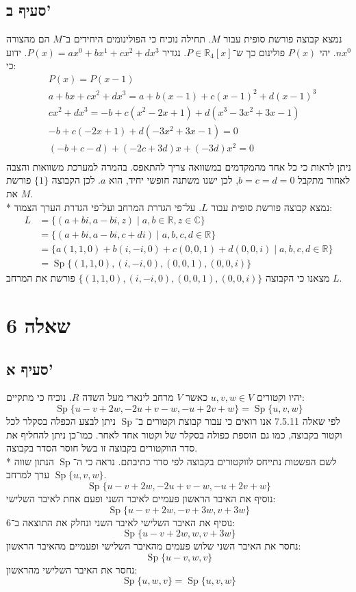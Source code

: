 \documentclass[a4paper,10pt]{article}
\DeclareMathOperator\Sp{Sp}
\def\RR{\mathbb{R}}
\def\CC{\mathbb{C}}
\begin{document}
	\subsection{סעיף ב'}
	נמצא קבוצה פורשת סופית עבור $M$.
	תחילה נוכיח כי הפולינומים היחידים ב־$M$ הם מהצורה $nx^0$.
	יהי $P(x)$ פולינום כך ש־$P \in \RR_4[x]$.
	נגדיר $P(x) = ax^0 + bx^1 + cx^2 + dx^3$.
	ידוע כי:
	\begin{align*}
		& P(x) = P(x - 1) \\
		& a + bx + cx^2 + dx^3
		= a + b(x - 1) + c{(x - 1)}^2 + d{(x - 1)}^3 \\
		& cx^2 + dx^3
		= -b + c(x^2 - 2x + 1) + d(x^3 - 3x^2 + 3x - 1) \\
		& -b + c(-2x + 1) + d(-3x^2 + 3x - 1) = 0 \\
		& (-b + c - d) + (-2c + 3d)x + (-3d)x^2 = 0 \\
	\end{align*}
	ניתן לראות כי כל אחד מהמקדמים במשוואה צריך להתאפס.
	בהמרה למערכת משוואות והצבה לאחור מתקבל $b = c = d = 0$,
	לכן ישנו משתנה חופשי יחיד, הוא $a$.
	לכן הקבוצה $\{1\}$ פורשת את $M$. \\*
	נמצא קבוצה פורשת סופית עבור $L$.
	על־פי הגדרת המרחב ועל־פי הגדרת הערך הצמוד:
	\begin{align*}
		L & = \{(a + bi, a - bi, z) \mid a, b \in \RR, z \in \CC \} \\
		& = \{(a + bi, a - bi, c + di) \mid a, b, c, d \in \RR \} \\
		& = \{a(1, 1, 0) + b(i, -i, 0) + c(0, 0, 1) + d(0, 0, i)
		\mid a, b, c, d \in \RR \} \\
		& = \Sp\{(1, 1, 0), (i, -i, 0), (0, 0, 1), (0, 0, i)\}
	\end{align*}
	מצאנו כי הקבוצה $\{(1, 1, 0), (i, -i, 0), (0, 0, 1), (0, 0, i)\}$
	פורשת את המרחב $L$.

	\section{שאלה 6}
	\subsection{סעיף א'}
	יהיו וקטורים $u, v, w \in V$ כאשר $V$ מרחב לינארי מעל השדה $R$.
	נוכיח כי מתקיים:
	\[
		\Sp\{u - v + 2w, -2u + v - w, -u + 2v + w\}
		= \Sp\{u, v, w\}
	\]
	לפי שאלה 7.5.11 אנו רואים כי עבור קבוצת וקטורים ב־$\Sp$
	ניתן לבצע הכפלה בסקלר לכל וקטור בקבוצה,
	כמו גם הוספת כפולה בסקלר של וקטור אחד לאחר.
	כמו־כן ניתן להחליף את סדר הווקטורים בקבוצה זו בשל חוסר הסדר בקבוצה. \\*
	לשם הפשטות נתייחס לווקטורים בקבוצה לפי סדר כתיבתם.
	נראה כי ה־$\Sp$ הנתון שווה ערך למרחב $\Sp\{u, v, w\}$.
	\[
			\Sp\{u - v + 2w, -2u + v - w, -u + 2v + w\}
	\]
	נוסיף את האיבר הראשון פעמיים לאיבר השני ופעם אחת לאיבר השלישי:
	\[
			\Sp\{u - v + 2w, -v + 3w, v + 3w\}
	\]
	נוסיף את האיבר השלישי לאיבר השני ונחלק את התוצאה ב־6:
	\[
			\Sp\{u - v + 2w, w, v + 3w\}
	\]
	נחסר את האיבר השני שלוש פעמים מהאיבר השלישי ופעמיים מהאיבר הראשון:
	\[
			\Sp\{u - v, w, v \}
	\]
	נחסר את האיבר השלישי מהראשון:
	\[
			\Sp\{u, w, v \} = 
			\Sp\{u, v, w \}
	\]
	
\end{document}
